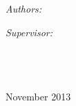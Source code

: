 \documentclass[11pt, a4paper, oneside]{Thesis} %
\begin{document}
\begin{titlepage}
\begin{center}

\textsc{\LARGE \univname}\\[1.5cm] %

\HRule \\[0.4cm] %
{\huge \bfseries \ttitle}\\[0.4cm] %
\HRule \\[1.5cm] %
 
\begin{minipage}{0.4\textwidth}
\begin{flushleft} \large
\emph{Authors:}\\
\authornames %
\end{flushleft}
\end{minipage}
\begin{minipage}{0.4\textwidth}
\begin{flushright} \large
\emph{Supervisor:} \\
\supname %
\end{flushright}
\end{minipage}\\[3cm]
\groupname\\\deptname\\[2cm] %
 
{\large November 2013}\\[4cm] %


\end{center}
\end{titlepage}
\end{document}
